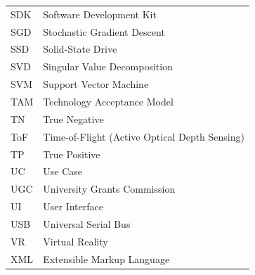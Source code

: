 {\begin{longtable}{l p{13.5cm}}
SDK & Software Development Kit \\
SGD & Stochastic Gradient Descent \\
SSD & Solid-State Drive \\
SVD & Singular Value Decomposition \\
SVM & Support Vector Machine \\
TAM & Technology Acceptance Model \\
TN & True Negative \\
ToF & Time-of-Flight (Active Optical Depth Sensing) \\
TP & True Positive \\
UC & Use Case \\
UGC & University Grants Commission \\
UI & User Interface \\
USB & Universal Serial Bus \\
VR & Virtual Reality \\
XML & Extensible Markup Language \\
\end{longtable}
}
